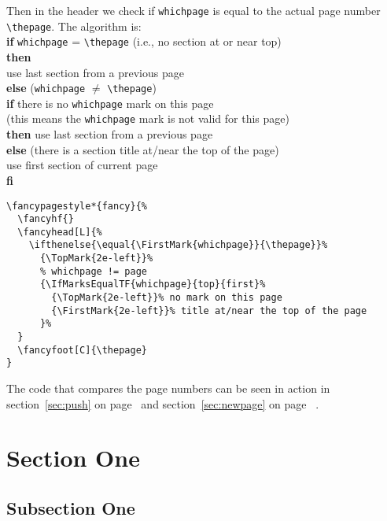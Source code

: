 \documentclass{article}
\begin{document}
\noindent
\begin{boxedminipage}{\textwidth}
Then in the header we check if \texttt{whichpage} is equal to the actual page number \verb|\thepage|. The algorithm is:\\[1ex]
%
\textbf{if} \texttt{whichpage} = \verb|\thepage| (i.e., no section at or near top)\\
\textbf{then}\\
\hspace*{2em} use last section from a previous page\\
\textbf{else} (\texttt{whichpage} $\ne$ \verb|\thepage|)\\
\hspace*{2em} \textbf{if} there is no \texttt{whichpage} mark on this page\\
\hspace*{3em} (this means the  \texttt{whichpage} mark is not valid for this page)\\
\hspace*{2em} \textbf{then} use last section from a previous page\\
\hspace*{2em} \textbf{else} (there is a section title at/near the top of the page)\\
\hspace*{3em} use first section of current page\\
\textbf{fi}

\begin{verbatim}
\fancypagestyle*{fancy}{%
  \fancyhf{}
  \fancyhead[L]{%
    \ifthenelse{\equal{\FirstMark{whichpage}}{\thepage}}%
      {\TopMark{2e-left}}%
      % whichpage != page
      {\IfMarksEqualTF{whichpage}{top}{first}%
        {\TopMark{2e-left}}% no mark on this page
        {\FirstMark{2e-left}}% title at/near the top of the page
      }%
  }
  \fancyfoot[C]{\thepage}
}
\end{verbatim}

The code that compares the page numbers can be seen in action in section~\ref{sec:push} on page~\pageref{sec:push} and section~\ref{sec:newpage} on page~ \pageref{sec:newpage}.
\end{boxedminipage}

\newpage
\pagestyle{fancy}

\section{Section One}

\subsection{Subsection One}
\end{document}
